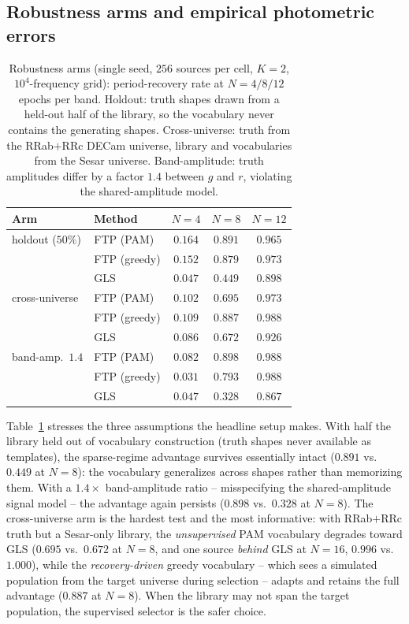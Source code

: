 \documentclass[apj]{emulateapj}
\begin{document}
\subsection{Robustness arms and empirical photometric errors}
\label{sec:simval-robust}

\begin{table}
\centering
\caption{\label{tab:robustness}
Robustness arms (single seed, $256$ sources per cell, $K = 2$,
$10^4$-frequency grid): period-recovery rate at $N = 4/8/12$ epochs per
band.  Holdout: truth shapes drawn from a held-out half of the
library, so the vocabulary never contains the generating shapes.
Cross-universe: truth from the RRab$+$RRc DECam universe, library
and vocabularies from the Sesar universe.  Band-amplitude: truth
amplitudes differ by a factor $1.4$ between $g$ and $r$, violating the
shared-amplitude model.}
\footnotesize
\begin{tabular}{llccc}
\hline\hline
Arm & Method & $N{=}4$ & $N{=}8$ & $N{=}12$ \\
\hline
holdout ($50\%$)  & FTP (PAM)    & $0.164$ & $0.891$ & $0.965$ \\
                  & FTP (greedy) & $0.152$ & $0.879$ & $0.973$ \\
                  & GLS          & $0.047$ & $0.449$ & $0.898$ \\
\hline
cross-universe    & FTP (PAM)    & $0.102$ & $0.695$ & $0.973$ \\
                  & FTP (greedy) & $0.109$ & $0.887$ & $0.988$ \\
                  & GLS          & $0.086$ & $0.672$ & $0.926$ \\
\hline
band-amp.\ $1.4$  & FTP (PAM)    & $0.082$ & $0.898$ & $0.988$ \\
                  & FTP (greedy) & $0.031$ & $0.793$ & $0.988$ \\
                  & GLS          & $0.047$ & $0.328$ & $0.867$ \\
\hline
\end{tabular}
\end{table}

Table~\ref{tab:robustness} stresses the three assumptions the headline
setup makes.  With half the library held out of vocabulary construction
(truth shapes never available as templates), the sparse-regime advantage
survives essentially intact ($0.891$ vs.\ $0.449$ at $N = 8$): the
vocabulary generalizes across shapes rather than memorizing them.  With
a $1.4\times$ band-amplitude ratio -- misspecifying the shared-amplitude
signal model -- the advantage again persists ($0.898$ vs.\ $0.328$ at
$N = 8$).  The cross-universe arm is the hardest test and the most
informative: with RRab$+$RRc truth but a Sesar-only library, the
\emph{unsupervised} PAM vocabulary degrades toward GLS ($0.695$ vs.\
$0.672$ at $N = 8$, and one source \emph{behind} GLS at $N = 16$,
$0.996$ vs.\ $1.000$), while the \emph{recovery-driven} greedy
vocabulary -- which sees a simulated population from the target
universe during selection -- adapts and retains the full advantage
($0.887$ at $N = 8$).  When the library may not span the target
population, the supervised selector is the safer choice.
\end{document}
